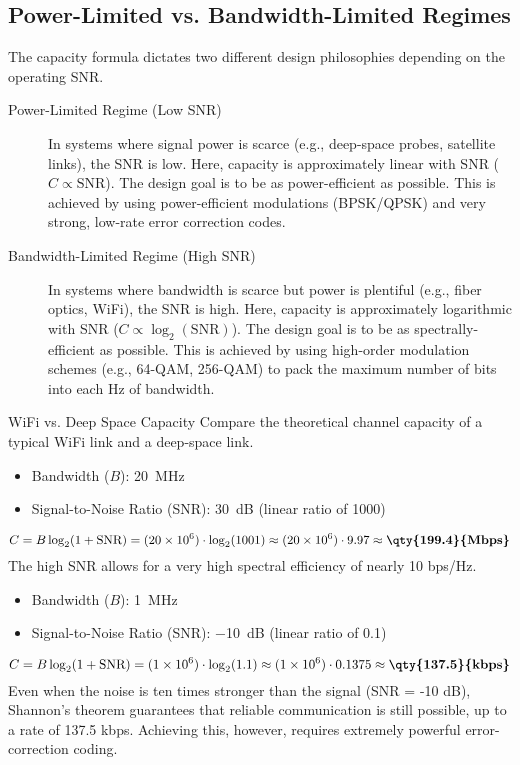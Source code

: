\subsection{Power-Limited vs. Bandwidth-Limited Regimes}

The capacity formula dictates two different design philosophies depending on the operating SNR.

\begin{description}
    \item[Power-Limited Regime (Low SNR)] In systems where signal power is scarce (e.g., deep-space probes, satellite links), the SNR is low. Here, capacity is approximately linear with SNR ($C \propto \text{SNR}$). The design goal is to be as power-efficient as possible. This is achieved by using power-efficient modulations (BPSK/QPSK) and very strong, low-rate error correction codes.
    \item[Bandwidth-Limited Regime (High SNR)] In systems where bandwidth is scarce but power is plentiful (e.g., fiber optics, WiFi), the SNR is high. Here, capacity is approximately logarithmic with SNR ($C \propto \log_2(\text{SNR})$). The design goal is to be as spectrally-efficient as possible. This is achieved by using high-order modulation schemes (e.g., 64-QAM, 256-QAM) to pack the maximum number of bits into each Hz of bandwidth.
\end{description}


\begin{workedexample}{WiFi vs. Deep Space Capacity}
     Compare the theoretical channel capacity of a typical WiFi link and a deep-space link.
    
    \begin{itemize}
        \item Bandwidth ($B$): \qty{20}{MHz}
        \item Signal-to-Noise Ratio (SNR): \qty{30}{dB} (linear ratio of 1000)
    \end{itemize}
    \[ C = B \log_2(1 + \text{SNR}) = (20 \times 10^6) \cdot \log_2(1001) \approx (20 \times 10^6) \cdot 9.97 \approx \textbf{\qty{199.4}{Mbps}} \]
    The high SNR allows for a very high spectral efficiency of nearly 10 bps/Hz.

    \begin{itemize}
        \item Bandwidth ($B$): \qty{1}{MHz}
        \item Signal-to-Noise Ratio (SNR): \qty{-10}{dB} (linear ratio of 0.1)
    \end{itemize}
    \[ C = B \log_2(1 + \text{SNR}) = (1 \times 10^6) \cdot \log_2(1.1) \approx (1 \times 10^6) \cdot 0.1375 \approx \textbf{\qty{137.5}{kbps}} \]
     Even when the noise is ten times stronger than the signal (SNR = -10 dB), Shannon's theorem guarantees that reliable communication is still possible, up to a rate of 137.5 kbps. Achieving this, however, requires extremely powerful error-correction coding.
\end{workedexample}

